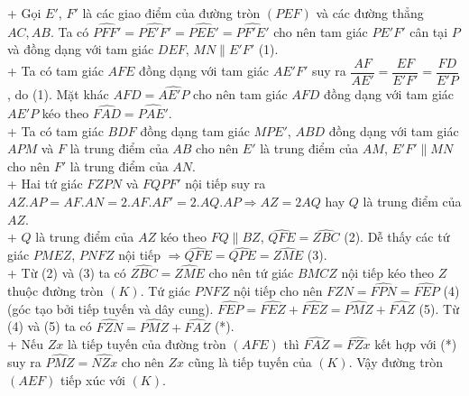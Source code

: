 \begin{ex}
{\begin{enumerate}
\begin{center}
\end{center}
+ Gọi $E'$, $F'$ là các giao điểm của đường tròn $(PEF)$ và các đường thẳng $AC,AB$. Ta có 
$\widehat{PFF'} = \widehat{PE'F'} = \widehat{PEE'} =\widehat{PF'E'}$ cho nên tam giác $PE'F'$ cân tại $P$
và đồng dạng với tam giác $DEF$, $MN \parallel E'F'$ (1). \\
+ Ta có tam giác $AFE$ đồng dạng với tam giác $AE'F'$ suy ra $\dfrac{AF}{AE'} = \dfrac{EF}{E'F'} = \dfrac{FD}{E'P}$,  do (1). Mặt khác $\widehat{AFD} =\widehat{AE'P}$ cho nên tam giác $AFD$ đồng dạng với tam giác $AE'P$ 
kéo theo $\widehat{FAD} = \widehat{PAE'}$. \\
+ Ta có tam giác $BDF$ đồng dạng tam giác $MPE'$, $ABD$ đồng dạng với tam giác $APM$ và $F$ là trung điểm của
$AB$ cho nên $E'$ là trung điểm của $AM$, $E'F' \parallel MN$ cho nên $F'$ là trung điểm của $AN$. \\
+ Hai tứ giác $FZPN$ và $FQPF'$ nội tiếp suy ra $AZ.AP = AF.AN = 2.AF.AF' =2.AQ.AP \Longrightarrow AZ=2AQ$ hay  $Q$ là trung điểm của $AZ$. \\
+ $Q$ là trung điểm của $AZ$ kéo theo $FQ \parallel BZ$, $\widehat{QFE} =\widehat{ZBC}$ (2). 
Dễ thấy các tứ giác $PMEZ$, $PNFZ$ nội tiếp $ \Longrightarrow \widehat{QFE} =\widehat{QPE} = \widehat{ZME}$ (3). \\
+ Từ (2) và (3) ta có $\widehat{ZBC} =\widehat{ZME}$ cho nên tứ giác $BMCZ$ nội tiếp kéo theo $Z$ thuộc đường tròn $(K)$.
Tứ giác $PNFZ$ nội tiếp cho nên $\widehat{FZN} = \widehat{FPN} =\widehat{FEP}$ (4)(góc tạo bởi tiếp tuyến và dây cung). $\widehat{FEP} = \widehat{FEZ} +\widehat{FEZ} = \widehat{PMZ} +\widehat{FAZ}$ (5).
Từ (4) và (5) ta có $\widehat{FZN} = \widehat{PMZ} +\widehat{FAZ}$ (*). \\
+ Nếu $Zx$ là tiếp tuyến của đường tròn $(AFE)$ thì $\widehat{FAZ} = \widehat{FZx}$ kết hợp với (*) suy ra $\widehat{PMZ} = \widehat{NZx}$ cho nên $Zx$ cũng là tiếp tuyến của $(K)$. Vậy đường tròn $(AEF)$ tiếp xúc với $(K)$. 
\end{enumerate}
}
\end{ex}

